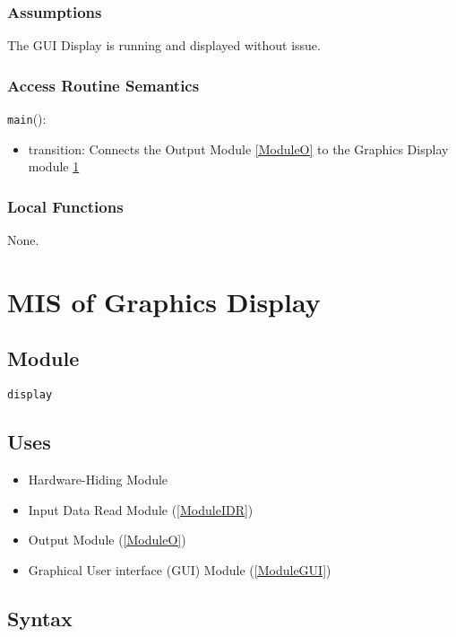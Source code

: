 \documentclass[12pt, titlepage]{article}
\def\code#1{\texttt{#1}}
\begin{document}
\subsubsection{Assumptions}

The GUI Display is running and displayed without issue.

\subsubsection{Access Routine Semantics}

\noindent \code{main}():
\begin{itemize}
  \item transition: Connects the Output Module \ref{ModuleO} to the Graphics Display module \ref{ModuleGD}
\end{itemize}

\subsubsection{Local Functions}

None.

\section{MIS of Graphics Display} \label{ModuleGD} 

\subsection{Module}

\code{display}

\subsection{Uses}

\begin{itemize}
  \item Hardware-Hiding Module  
  \item Input Data Read Module (\ref{ModuleIDR})
  \item Output Module (\ref{ModuleO})
  \item Graphical User interface (GUI) Module (\ref{ModuleGUI})
\end{itemize}

\subsection{Syntax}
\end{document}
